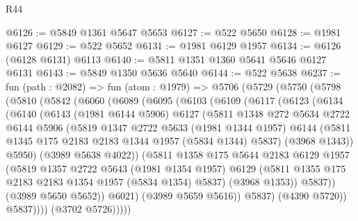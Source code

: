 \begin{lexlean}{R44}
\begin{coremodule}
@6126 := @5849 @1361 @5647 @5653
@6127 := @522 @5650
@6128 := @1981 @6127
@6129 := @522 @5652
@6131 := @1981 @6129 @1957
@6134 := @6126 (@6128 @6131) @6113
@6140 := @5811 @1351 @1360 @5641 @5646 @6127 @6131
@6143 := @5849 @1350 @5636 @5640
@6144 := @522 @5638
@6237 := fun (path : @2082) =>
  fun (atom : @1979) =>
  @5706
    (@5729
      (@5750
        (@5798
          (@5810
            (@5842
              (@6060
                (@6089
                  (@6095
                    (@6103
                      (@6109
                        (@6117
                          (@6123
                            (@6134
                              (@6140
                                (@6143
                                  (@1981 @6144 @5906)
                                  @6127
                                  (@5811
                                    @1348
                                    @272
                                    @5634
                                    @2722
                                    @6144
                                    @5906
                                    (@5819
                                      @1347
                                      @2722
                                      @5633
                                      (@1981 @1344 @1957)
                                      @6144
                                      (@5811 @1345 @175 @2183 @2183 @1344 @1957 (@5834 @1344) @5837)
                                      (@3968 @1343))
                                    @5950)
                                  (@3989 @5638 @4022))
                                (@5811
                                  @1358
                                  @175
                                  @5644
                                  @2183
                                  @6129
                                  @1957
                                  (@5819
                                    @1357
                                    @2722
                                    @5643
                                    (@1981 @1354 @1957)
                                    @6129
                                    (@5811 @1355 @175 @2183 @2183 @1354 @1957 (@5834 @1354) @5837)
                                    (@3968 @1353))
                                  @5837))
                              (@3989 @5650 @5652))
                            @6021)
                          (@3989 @5659 @5616))
                        @5837)
                      (@4390 @5720))
                    @5837))))
            (@3702 @5726)))))

\end{coremodule}
\end{lexlean}
